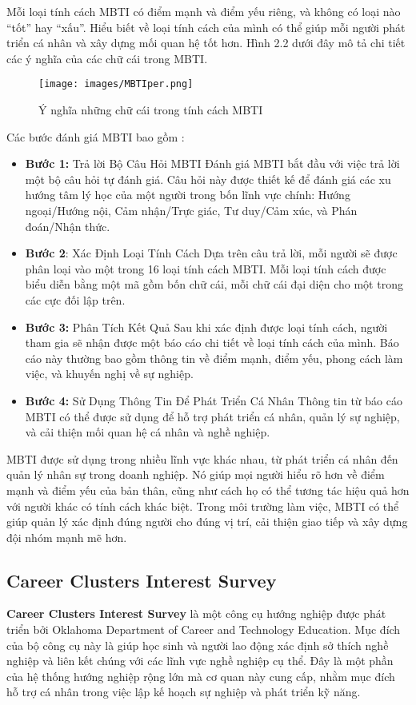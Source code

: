 Mỗi loại tính cách MBTI có điểm mạnh và điểm yếu riêng, và không có loại nào “tốt” hay “xấu”. Hiểu biết về loại tính cách của mình có thể giúp mỗi người phát triển cá nhân và xây dựng mối quan hệ tốt hơn. Hình 2.2 dưới đây mô tả chi tiết các ý nghĩa của các chữ cái trong MBTI.

\begin{figure}[H]
    \centering
    \texttt{[image: images/MBTIper.png]}
    \vspace{0.6cm}
    \caption{Ý nghĩa những chữ cái trong tính cách MBTI}
\end{figure}

Các bước đánh giá MBTI bao gồm : 
\begin{itemize}
    \item \textbf{Bước 1:} Trả lời Bộ Câu Hỏi MBTI Đánh giá MBTI bắt đầu với việc trả lời một bộ câu hỏi tự đánh giá. Câu hỏi này được thiết kế để đánh giá các xu hướng tâm lý học của một người trong bốn lĩnh vực chính: Hướng ngoại/Hướng nội, Cảm nhận/Trực giác, Tư duy/Cảm xúc, và Phán đoán/Nhận thức.
    \item \textbf{Bước 2}: Xác Định Loại Tính Cách Dựa trên câu trả lời, mỗi người sẽ được phân loại vào một trong 16 loại tính cách MBTI. Mỗi loại tính cách được biểu diễn bằng một mã gồm bốn chữ cái, mỗi chữ cái đại diện cho một trong các cực đối lập trên.
    \item \textbf{Bước 3:} Phân Tích Kết Quả Sau khi xác định được loại tính cách, người tham gia sẽ nhận được một báo cáo chi tiết về loại tính cách của mình. Báo cáo này thường bao gồm thông tin về điểm mạnh, điểm yếu, phong cách làm việc, và khuyến nghị về sự nghiệp.
    \item \textbf{Bước 4:} Sử Dụng Thông Tin Để Phát Triển Cá Nhân Thông tin từ báo cáo MBTI có thể được sử dụng để hỗ trợ phát triển cá nhân, quản lý sự nghiệp, và cải thiện mối quan hệ cá nhân và nghề nghiệp.
\end{itemize}

MBTI được sử dụng trong nhiều lĩnh vực khác nhau, từ phát triển cá nhân đến quản lý nhân sự trong doanh nghiệp. Nó giúp mọi người hiểu rõ hơn về điểm mạnh và điểm yếu của bản thân, cũng như cách họ có thể tương tác hiệu quả hơn với người khác có tính cách khác biệt. Trong môi trường làm việc, MBTI có thể giúp quản lý xác định đúng người cho đúng vị trí, cải thiện giao tiếp và xây dựng đội nhóm mạnh mẽ hơn.

\subsection{Career Clusters Interest Survey}\label{2.1.3}
\textbf{Career Clusters Interest Survey} là một công cụ hướng nghiệp được phát triển bởi Oklahoma Department of Career and Technology Education. Mục đích của bộ công cụ này là giúp học sinh và người lao động xác định sở thích nghề nghiệp và liên kết chúng với các lĩnh vực nghề nghiệp cụ thể. Đây là một phần của hệ thống hướng nghiệp rộng lớn mà cơ quan này cung cấp, nhằm mục đích hỗ trợ cá nhân trong việc lập kế hoạch sự nghiệp và phát triển kỹ năng.

